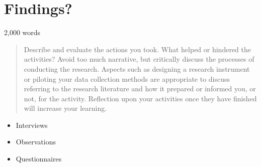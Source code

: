 \section{Findings?}
2,000 words 

\begin{quote}
Describe and evaluate the actions you took. What helped or hindered the activities? Avoid too much narrative, but critically discuss the processes of conducting the research. Aspects such as designing a research instrument or piloting your data collection methods are appropriate to discuss referring to the research literature and how it prepared or informed you, or not, for the activity. Reflection upon your activities once they have finished will increase your learning.
\end{quote}

\begin{itemize}
\item Interviews
\item Observations
\item Questionnaires 
\end{itemize}


